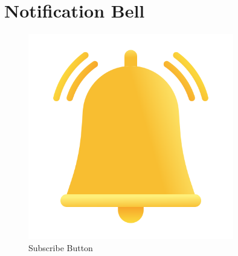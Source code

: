 \section{Notification Bell}
\begin{figure}[ht]
    \centering
    \includegraphics[width=0.8\textwidth]{images/ringing.png}
    \caption{Subscribe Button}
    \label{fig:Notification}
\end{figure}